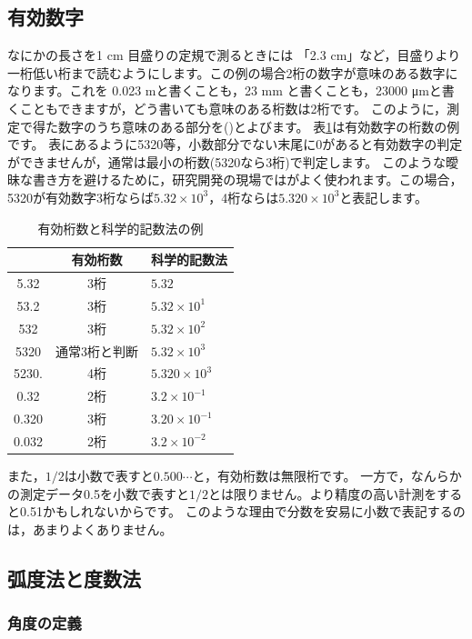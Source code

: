 \documentclass[twocolumn,11pt]{jarticle}
\begin{document}
\subsection{有効数字}
なにかの長さを1 cm 目盛りの定規で測るときには 「2.3 cm」など，目盛りより一桁低い桁まで読むようにします。この例の場合2桁の数字が意味のある数字になります。これを 0.023 mと書くことも，23 mm と書くことも，23000 μmと書くこともできますが，どう書いても意味のある桁数は2桁です。
このように，測定で得た数字のうち意味のある部分を()とよびます。
表\ref{tab:sig}は有効数字の桁数の例です。
表にあるように5320等，小数部分でない末尾に0があると有効数字の判定ができませんが，通常は最小の桁数(5320なら3桁)で判定します。
このような曖昧な書き方を避けるために，研究開発の現場ではがよく使われます。この場合，5320が有効数字3桁ならば$5.32\times 10^{3}$，4桁ならは$5.320\times 10^{3}$と表記します。
\begin{table}
\begin{tabular}{ccl}\hline
&有効桁数&科学的記数法\\\hline
5.32 & 3桁 & $5.32$ \\
53.2 & 3桁 & $5.32\times 10^1$ \\
532  & 3桁 & $5.32\times 10^2$ \\
5320 & 通常3桁と判断 & $5.32\times 10^3$\\
5230. & 4桁 & $5.320\times 10^3$ \\
0.32 & 2桁 & $3.2\times 10^{-1}$\\
0.320 & 3桁& $3.20\times 10^{-1}$\\
0.032 & 2桁& $3.2\times 10^{-2}$\\\hline
\end{tabular}
\caption{\label{tab:sig}有効桁数と科学的記数法の例}
\end{table}


また，$1/2$は小数で表すと$0.500\cdots$と，有効桁数は無限桁です。
一方で，なんらかの測定データ0.5を小数で表すと$1/2$とは限りません。より精度の高い計測をすると0.51かもしれないからです。 このような理由で分数を安易に小数で表記するのは，あまりよくありません。

\subsection{弧度法と度数法}
\subsubsection{角度の定義}
\end{document}
